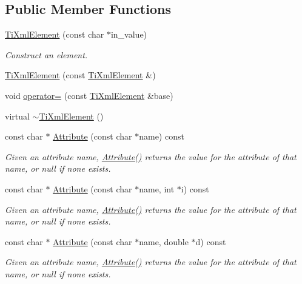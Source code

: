 \subsection*{Public Member Functions}
\begin{DoxyCompactItemize}
\item 
\hyperlink{classTiXmlElement_a01bc3ab372d35da08efcbbe65ad90c60}{TiXmlElement} (const char $\ast$in\_\-value)
\begin{DoxyCompactList}\small\item\em Construct an element. \item\end{DoxyCompactList}\item 
\hyperlink{classTiXmlElement_a1ca4465f3c2eac6a60e641cd7f1d9f7e}{TiXmlElement} (const \hyperlink{classTiXmlElement}{TiXmlElement} \&)
\item 
void \hyperlink{classTiXmlElement_af5cd4156e082ef3bf23adfe0ed173340}{operator=} (const \hyperlink{classTiXmlElement}{TiXmlElement} \&base)
\item 
virtual \hyperlink{classTiXmlElement_aa049a47c5081c0d021968666360da261}{$\sim$TiXmlElement} ()
\item 
const char $\ast$ \hyperlink{classTiXmlElement_ac1e4691e9375ba4e665dce7e46a50a9c}{Attribute} (const char $\ast$name) const 
\begin{DoxyCompactList}\small\item\em Given an attribute name, \hyperlink{classTiXmlElement_ac1e4691e9375ba4e665dce7e46a50a9c}{Attribute()} returns the value for the attribute of that name, or null if none exists. \item\end{DoxyCompactList}\item 
const char $\ast$ \hyperlink{classTiXmlElement_aa9192e80567b5042dbded80b78c44339}{Attribute} (const char $\ast$name, int $\ast$i) const 
\begin{DoxyCompactList}\small\item\em Given an attribute name, \hyperlink{classTiXmlElement_ac1e4691e9375ba4e665dce7e46a50a9c}{Attribute()} returns the value for the attribute of that name, or null if none exists. \item\end{DoxyCompactList}\item 
const char $\ast$ \hyperlink{classTiXmlElement_aec4f727f8aa49b51248d80125d173136}{Attribute} (const char $\ast$name, double $\ast$d) const 
\begin{DoxyCompactList}\small\item\em Given an attribute name, \hyperlink{classTiXmlElement_ac1e4691e9375ba4e665dce7e46a50a9c}{Attribute()} returns the value for the attribute of that name, or null if none exists. \item\end{DoxyCompactList}\item 

\end{DoxyCompactItemize}
